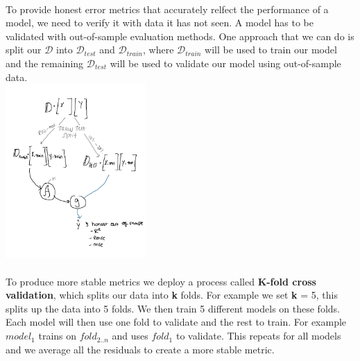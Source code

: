 \documentclass[12pt]{article}
\begin{document}
\begin{enumerate}
 \\ 
To provide honest error metrics that accurately relfect the performance of a model, we need to verify it with data it has not seen. A model has to be validated with out-of-sample evaluation methods. One approach that we can do is split our \( \mathcal{D}\) into \( \mathcal{D}_{test} \) and \( \mathcal{D}_{train} \), where \( \mathcal{D}_{train} \) will be used to train our model and the remaining \( \mathcal{D}_{test} \) will be used to validate our model using out-of-sample data. \\
\includegraphics[width=0.4\textwidth]{3q.png} \\


 \\ 
To produce more stable metrics we deploy a process called \textbf{K-fold cross validation}, which splits our data into \textbf{k} folds. For example we set \textbf{k} = 5, this splits up the data into 5 folds. We then train 5 different models on these folds. Each model will then use one fold to validate and the rest to train. For example \(model_1\) trains on \(fold_{2..n}\) and uses \(fold_{1}\) to validate. This repeats for all models and we average all the residuals to create a more stable metric.




\end{enumerate}

\newpage
{}
\end{document}
